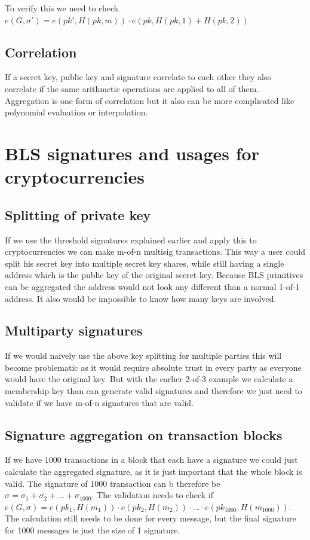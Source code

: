 \documentclass[a4paper,12pt]{scrartcl}
\begin{document}
To verify this we need to check $e(G,\sigma') = e(pk',H(pk,m)) \cdot e(pk, H(pk,1)+H(pk,2))$

\subsection{Correlation}

If a secret key, public key and signature correlate to each other they also correlate if the same arithmetic operations are applied to all of them. Aggregation is one form of correlation but it also can be more complicated like polynomial evaluation or interpolation.


\pagebreak

\section{BLS signatures and usages for cryptocurrencies}

\subsection{Splitting of private key}
If we use the threshold signatures explained earlier and apply this to cryptocurrencies we can make m-of-n multisig transactions. This way a user could split his secret key into multiple secret key shares, while still having a single address which is the public key of the original secret key. Because BLS primitives can be aggregated the address would not look any different than a normal 1-of-1 address. It also would be impossible to know how many keys are involved.

\subsection{Multiparty signatures}
If we would naively use the above key splitting for multiple parties this will become problematic as it would require absolute trust in every party as everyone would have the original key. But with the earlier 2-of-3 example we calculate a membership key than can generate valid signatures and therefore we just need to validate if we have m-of-n signatures that are valid.

\subsection{Signature aggregation on transaction blocks}
If we have 1000 transactions in a block that each have a signature we could just calculate the aggregated signature, as it is just important that the whole block is valid. The signature of 1000 transaction can b therefore be $\sigma = \sigma_1 + \sigma_2 + ... + \sigma_{1000}$. The validation needs to check if $e(G,\sigma) = e(pk_1,H(m_1)) \cdot e(pk_2,H(m_2)) \cdot ... \cdot e(pk_{1000},H(m_{1000}))$. The calculation still needs to be done for every message, but the final signature for 1000 messages is just the size of 1 signature.
\end{document}

